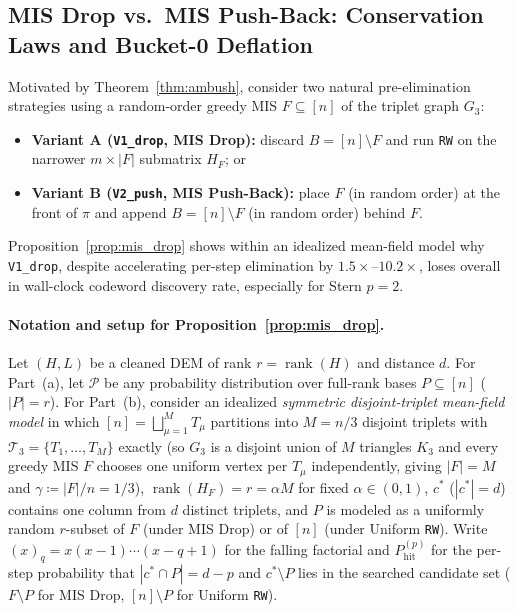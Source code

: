 \documentclass[12pt]{article}
\theoremstyle{definition}
\DeclareMathOperator{\rank}{rank}
\newcommand{\Tc}{\mathcal{T}_3}
\newcommand{\ttt}[1]{\texttt{#1}}
\begin{document}
\subsection{MIS Drop vs.\ MIS Push-Back: Conservation Laws and Bucket-0 Deflation}\label{subsec:drop_vs_push}

Motivated by Theorem~\ref{thm:ambush}, consider two natural pre-elimination strategies using a random-order greedy
MIS $F \subseteq [n]$ of the triplet graph $G_3$:
\begin{itemize}
  \item \textbf{Variant A (\ttt{V1\_drop}, MIS Drop):} discard $B = [n] \setminus F$ and run \ttt{RW} on the
    narrower $m \times |F|$ submatrix $H_F$; or
  \item \textbf{Variant B (\ttt{V2\_push}, MIS Push-Back):} place $F$ (in random order) at the front of $\pi$ and
    append $B = [n] \setminus F$ (in random order) behind $F$.
\end{itemize}

Proposition~\ref{prop:mis_drop} shows within an idealized mean-field model why \ttt{V1\_drop}, despite accelerating
per-step elimination by $1.5\times$--$10.2\times$, loses overall in wall-clock codeword discovery rate, especially
for Stern $p = 2$.

\paragraph{Notation and setup for Proposition~\ref{prop:mis_drop}.}
Let $(H, L)$ be a cleaned DEM of rank $r = \rank(H)$ and distance $d$. For Part~(a), let $\mathcal{P}$ be any
probability distribution over full-rank bases $P \subseteq [n]$ ($|P| = r$). For Part~(b), consider an idealized
\emph{symmetric disjoint-triplet mean-field model} in which $[n] = \bigsqcup_{\mu=1}^M T_\mu$ partitions into $M =
n / 3$ disjoint triplets with $\Tc = \{T_1, \dots, T_M\}$ exactly (so $G_3$ is a disjoint union of $M$ triangles
$K_3$ and every greedy MIS $F$ chooses one uniform vertex per $T_\mu$ independently, giving $|F| = M$ and $\gamma
\coloneqq |F|/n = 1/3$), $\rank(H_F) = r = \alpha M$ for fixed $\alpha \in (0, 1)$, $c^*$ ($|c^*| = d$) contains
one column from $d$ distinct triplets, and $P$ is modeled as a uniformly random $r$-subset of $F$ (under MIS Drop)
or of $[n]$ (under Uniform \ttt{RW}). Write $(x)_q = x(x - 1)\cdots(x - q + 1)$ for the falling factorial and
$P_{\mathrm{hit}}^{(p)}$ for the per-step probability that $|c^* \cap P| = d - p$ and $c^* \setminus P$ lies in the
searched candidate set ($F \setminus P$ for MIS Drop, $[n] \setminus P$ for Uniform \ttt{RW}).
\end{document}

